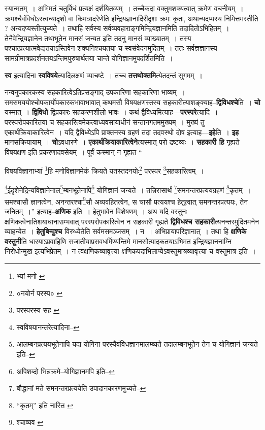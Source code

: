 \documentclass[article,12pt,a4paper]{memoir}
\begin{document}
	  \pstart स्यान्मतम् । अभिमतं चतुर्विधं प्रत्यक्षं दर्शयितव्यम् । तच्चैकदा वक्तुमशक्यत्वात् क्रमेण वचनीयम् । क्रमश्चैवंविधोऽस्त्वन्यादृशो वा किमत्रादरेणेति इन्द्रियज्ञानादिरीदृशः क्रमः कृतः, अथान्यदप्यस्य निमित्तमस्तीति ? अन्यदप्यस्तीत्युच्यते । तथाहि सर्वस्य सर्वव्यवहाराङ्गमिन्द्रियज्ञानमिति तदादितोऽभिहितम् । तेनैवेन्द्रियज्ञानेन तथाभूतेन मानसं जन्यत इति तदनु मानसं व्याख्यातम् । तस्य पश्चात्प्रत्यात्मवेद्यतयाऽस्तिवेन शक्यनिश्चयतया च स्वसंवेदनमुदितम् । ततः सर्वज्ञज्ञानस्य सामग्रीमात्रप्रदर्शनतयऽन्तिमपुरुषार्थतया चान्ते योगिज्ञानमुपदर्शितमिति ।
	\pend
      

	  \pstart \textbf{स्व} इत्यादिना \textbf{स्वविषये}त्यादिलक्षणं व्याचष्टे । तच्च \textbf{तत्तथोक्तमि}त्येतदन्तं सुगमम् ।
	\pend
      

	  \pstart नन्वनुपकारकस्य सहकारित्वेऽतिप्रसङ्गाद् उपकारिणा सहकारिणा भाव्यम् । समसमययोश्चोपकार्योपकारकभावाभावात् कथमसौ विषयक्षणस्तस्य सहकारीत्याशङ्क्याह--\textbf{द्विविधश्चे}ति । \textbf{चो} यस्मात् । \textbf{द्विविधो} द्विप्रकारः सहकरणशीलो भावः । कथं द्वैविध्यमित्याह—\textbf{परस्परे}त्यादि । परस्परोपकारितया च सहकारित्वमेकत्वाध्यवसायाधीनं सन्तानगतममुख्यम् । मुख्यं तु एकार्थक्रियाकारित्वेन । यदि द्वैविध्येऽपि प्राक्तनस्य ग्रहणं तदा तदवस्थो दोष इत्याह—\textbf{इहे}ति । \textbf{इह} मानसक्रियायाम् । \textbf{चो}ऽवधारणे । \textbf{एकार्थक्रियाकारित्वेने}त्यस्मात् परो द्रष्टव्यः । \textbf{सहकारी हि} गृह्यते विषयक्षण इति प्रकरणादवसेयम् । पूर्वं कस्मान् न गृह्यत  \leavevmode{} “
	  
	विषयविज्ञानाभ्यां \footnote{भ्यां मनो \cite{dp-msD} \cite{dp-msB}}हि मनोविज्ञानमेकं क्रियते यतस्तदनयोः\footnote{०नयोर्न परस्प० \cite{dp-msA} \cite{dp-msC} \cite{dp-edP} \cite{dp-edH} \cite{dp-edE} \cite{dp-edN}} परस्पर \footnote{परस्परस्य सह \cite{dp-msB} \cite{dp-msD}}सहकारित्वम् । 
	  
	\footnote{स्वविषयानन्तरेत्यादिना--\cite{dp-msD-n}}ईदृशेनेद्रिन्यविज्ञानेनाल\footnote{आलम्बनप्रत्ययभूतेनापि \cite{dp-msA} \cite{dp-msB} \cite{dp-msC} \cite{dp-msD} \cite{dp-edP} \cite{dp-edH} \cite{dp-edE} \cite{dp-edN} यदा योगिना परस्यैवंविधज्ञानमालम्ब्यते तदालम्बनभूतेन तेन च योगिज्ञानं जन्यते इति--\cite{dp-msD-n}}म्बनभूतेनापि\footnote{अपिशब्दो भिन्नक्रमे--योगिज्ञानमपि इति--\cite{dp-msD-n}} योगिज्ञानं जन्यते । तन्निरासार्थं \footnote{बौद्धानां मते समनन्तरप्रत्ययेति उपादानकारणमुच्यते--\cite{dp-msD-n}}समनन्तरप्रत्ययग्रहणं \footnote{“कृतम्” इति नास्ति \cite{dp-msD} \cite{dp-msB}}कृतम् । समश्चासौ ज्ञानत्वेन, अनन्तरश्चा\footnote{श्चाव्यव \cite{dp-msD} \cite{dp-msB}}सौ अव्यवहितत्वेन, स चासौ प्रत्ययश्च हेतुत्वात् समनन्तरप्रत्ययः, तेन जनितम् ।” इत्याह--\textbf{क्षणिक} इति । हेतुभावेन विशेषणम् । अथ यदि वस्तुनः क्षणिकत्वेनातिशयाधानासम्भवात् परस्परोपकारित्वेन न सहकारी गृह्यते \textbf{द्विविधश्च सहकारी}त्यनन्तरमुदितमनेन व्याहन्येत । \textbf{हेतुबिन्दुश्च} विरुध्येतेति सर्वमसमञ्जसम् । न । अभिप्रायापरिज्ञानात् । तथा हि \textbf{क्षणिके वस्तुनी}ति धारयाऽप्रवाहिणि सजातीयाप्रसवधर्मिण्यन्तिमे मानसोत्पादकतयाऽभिमत इन्द्रियज्ञाननाम्नि निरोधोन्मुख इत्यभिप्रेतम् । न त्वक्षणिकव्यावृत्त्या क्षणिकपदाभिलाप्येऽवस्तुमात्रव्यावृत्त्या च वस्तुमात्र इति ।
	\pend
      
\end{document}
